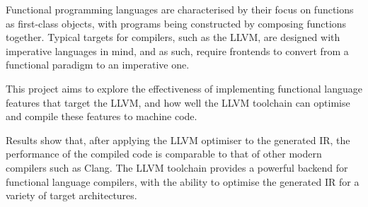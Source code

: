 Functional programming languages are characterised by their focus on functions as first-class
objects, with programs being constructed by composing functions together. Typical targets for
compilers, such as the LLVM, are designed with imperative languages in mind, and as such, require
frontends to convert from a functional paradigm to an imperative one.

This project aims to explore the effectiveness of implementing functional language features that
target the LLVM, and how well the LLVM toolchain can optimise and compile these features to
machine code.

Results show that, after applying the LLVM optimiser to the generated IR, the performance of the
compiled code is comparable to that of other modern compilers such as Clang. The LLVM toolchain
provides a powerful backend for functional language compilers, with the ability to optimise the
generated IR for a variety of target architectures.
